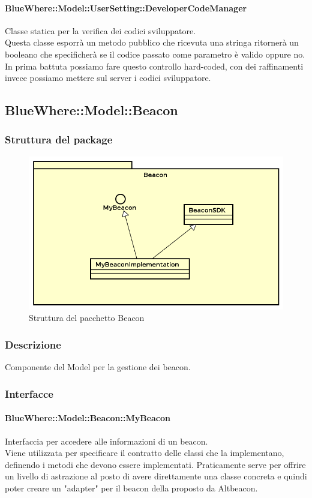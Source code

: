 \documentclass[../SpecificaTecnica.tex]{subfiles}
\begin{document}
			\paragraph{BlueWhere::Model::UserSetting::DeveloperCodeManager}
				Classe statica per la verifica dei codici sviluppatore. \\
				Questa classe esporrà un metodo pubblico che ricevuta una stringa ritornerà un booleano che specificherà se il codice passato come parametro è valido oppure no. In prima battuta possiamo fare questo controllo hard-coded, con dei raffinamenti invece possiamo mettere sul server i codici sviluppatore.
	\newpage
	\subsection{BlueWhere::Model::Beacon}
		\subsubsection{Struttura del package}
		\begin{figure}[!h]
			\centering
			\includegraphics[scale=0.6]{diagrammi/Beacon.png}
				\caption{Struttura del pacchetto Beacon}
			\label{fig:Struttura_MVP}
		\end{figure} 
		\subsubsection{Descrizione}
			Componente del Model per la gestione dei beacon.
		\subsubsection{Interfacce}
			\paragraph{BlueWhere::Model::Beacon::MyBeacon}
				Interfaccia per accedere alle informazioni di un beacon. \\ 
				Viene utilizzata per specificare il contratto delle classi che la implementano, definendo i metodi che devono essere implementati. Praticamente serve per offrire un livello di astrazione al posto di avere direttamente una classe concreta e quindi poter creare un "adapter" per il beacon della proposto da Altbeacon.
\end{document}
